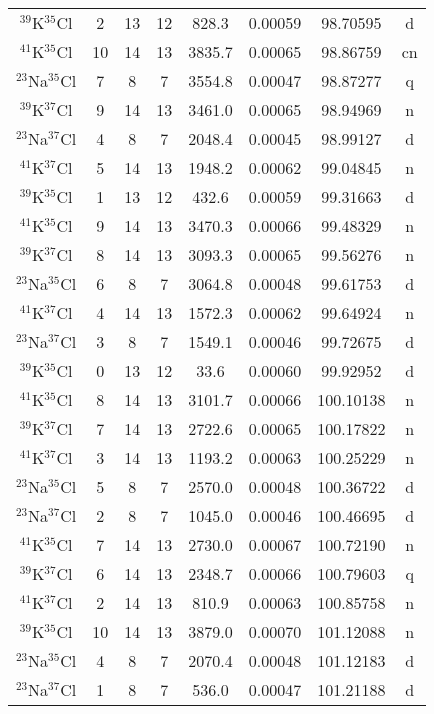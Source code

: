 \begin{table*}[htp]
\begin{tabular}{cccccccc}
$^{39}$K$^{35}$Cl & 2 & 13 & 12 & 828.3 & 0.00059 & 98.70595 & d \\
$^{41}$K$^{35}$Cl & 10 & 14 & 13 & 3835.7 & 0.00065 & 98.86759 & cn \\
$^{23}$Na$^{35}$Cl & 7 & 8 & 7 & 3554.8 & 0.00047 & 98.87277 & q \\
$^{39}$K$^{37}$Cl & 9 & 14 & 13 & 3461.0 & 0.00065 & 98.94969 & n \\
$^{23}$Na$^{37}$Cl & 4 & 8 & 7 & 2048.4 & 0.00045 & 98.99127 & d \\
$^{41}$K$^{37}$Cl & 5 & 14 & 13 & 1948.2 & 0.00062 & 99.04845 & n \\
$^{39}$K$^{35}$Cl & 1 & 13 & 12 & 432.6 & 0.00059 & 99.31663 & d \\
$^{41}$K$^{35}$Cl & 9 & 14 & 13 & 3470.3 & 0.00066 & 99.48329 & n \\
$^{39}$K$^{37}$Cl & 8 & 14 & 13 & 3093.3 & 0.00065 & 99.56276 & n \\
$^{23}$Na$^{35}$Cl & 6 & 8 & 7 & 3064.8 & 0.00048 & 99.61753 & d \\
$^{41}$K$^{37}$Cl & 4 & 14 & 13 & 1572.3 & 0.00062 & 99.64924 & n \\
$^{23}$Na$^{37}$Cl & 3 & 8 & 7 & 1549.1 & 0.00046 & 99.72675 & d \\
$^{39}$K$^{35}$Cl & 0 & 13 & 12 & 33.6 & 0.00060 & 99.92952 & d \\
$^{41}$K$^{35}$Cl & 8 & 14 & 13 & 3101.7 & 0.00066 & 100.10138 & n \\
$^{39}$K$^{37}$Cl & 7 & 14 & 13 & 2722.6 & 0.00065 & 100.17822 & n \\
$^{41}$K$^{37}$Cl & 3 & 14 & 13 & 1193.2 & 0.00063 & 100.25229 & n \\
$^{23}$Na$^{35}$Cl & 5 & 8 & 7 & 2570.0 & 0.00048 & 100.36722 & d \\
$^{23}$Na$^{37}$Cl & 2 & 8 & 7 & 1045.0 & 0.00046 & 100.46695 & d \\
$^{41}$K$^{35}$Cl & 7 & 14 & 13 & 2730.0 & 0.00067 & 100.72190 & n \\
$^{39}$K$^{37}$Cl & 6 & 14 & 13 & 2348.7 & 0.00066 & 100.79603 & q \\
$^{41}$K$^{37}$Cl & 2 & 14 & 13 & 810.9 & 0.00063 & 100.85758 & n \\
$^{39}$K$^{35}$Cl & 10 & 14 & 13 & 3879.0 & 0.00070 & 101.12088 & n \\
$^{23}$Na$^{35}$Cl & 4 & 8 & 7 & 2070.4 & 0.00048 & 101.12183 & d \\
$^{23}$Na$^{37}$Cl & 1 & 8 & 7 & 536.0 & 0.00047 & 101.21188 & d \\
\hline
\end{tabular}

\par 
\end{table*}
